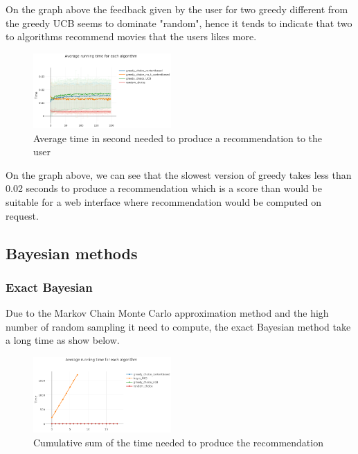 \documentclass[letterpaper]{article}
\begin{document}
On the graph above the feedback given by the user for two greedy different from the greedy UCB seems to dominate "random", hence it tends to indicate that two to algorithms recommend movies that the users likes more.

\begin{figure}[H]
\begin{center}
\includegraphics[width=0.47\textwidth]{img/greedy3.png}
\caption{Average time in second needed to produce a recommendation to the user}
\label{greedy3}
\end{center}
\end{figure}

On the graph above, we can see that the slowest version of greedy takes less than 0.02 seconds to produce a recommendation which is a score than would be suitable for a web interface where recommendation would be computed on request.


\subsection{Bayesian methods}

\subsubsection{Exact Bayesian}

Due to the Markov Chain Monte Carlo approximation method and the high number of random sampling it need to compute, the exact Bayesian method take a long time as show below.

\begin{figure}[H]
\begin{center}
\includegraphics[width=0.47\textwidth]{img/bayes_time1.png}
\caption{Cumulative sum of the time needed to produce the recommendation}
\label{bayes_time1}
\end{center}
\end{figure}
\end{document}
